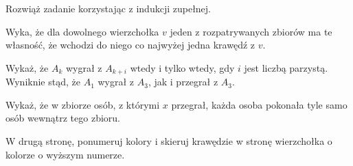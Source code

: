 
\begin{hints_list}
	\item *
	\item Rozwiąż zadanie korzystając z indukcji zupełnej.
	\item Wyka, że dla dowolnego wierzchołka $v$ jeden z rozpatrywanych zbiorów ma te własność, że wchodzi do niego co najwyżej jedna krawędź z $v$.
	\item Wykaż, że $A_k$ wygrał z $A_{k + i}$ wtedy i tylko wtedy, gdy $i$ jest liczbą parzystą. Wyniknie stąd, że $A_1$ wygrał z $A_3$, jak i przegrał z $A_3$.
	\item Wykaż, że w zbiorze osób, z którymi $x$ przegrał, każda osoba pokonała tyle samo osób wewnątrz tego zbioru.
	\item W drugą stronę, ponumeruj kolory i skieruj krawędzie w stronę wierzchołka o kolorze o wyższym numerze.
\end{hints_list}